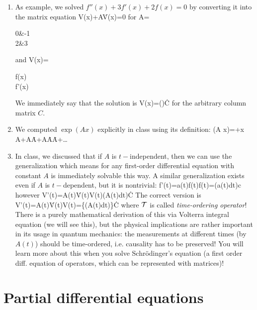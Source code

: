 {\begin{enumerate}
		\item As example, we solved $f''(x)+3f'(x)+2f(x)=0$ by converting it into the matrix equation
		\be 
		V(x)+A\. V(x)=0
		\ee 
		for 
		\be 
		A=\begin{pmatrix}
		0&-1\\2&3
		\end{pmatrix}
		\ee
		and
		\be 
		V(x)=\begin{pmatrix}
			f(x)\\f'(x)
		\end{pmatrix}
		\ee 
		We immediately say that the solution is 
		\be 
		V(x)=()\. C
		\ee 
		for the arbitrary column matrix $C$.
		\item We computed $\exp(A x)$ explicitly in class using its definition:
		\be 
		\exp(A x)=+x A+A\.A+A\.A\.A+\dots
		\ee 
		\item In class, we discussed that if $A$ is $t-$independent, then we can use the generalization
		\be 
		\left[f'(t)=af(t)\rightarrow f(t)=\exp(at)c\right]\Rightarrow\left[V'(t)=A\.V(t)\rightarrow V(t)=\exp(At)\.C\right]
		\ee
		which means for any first-order differential equation with constant $A$ is immediately solvable this way. A similar generalization exists even if $A$ is $t-$dependent, but it is nontrivial: 
		\be 
		f'(t)=a(t)f(t)\rightarrow f(t)=\exp\left(\int a(t)dt\right)c
		\ee
		however
		\be 
		V'(t)=A(t)\.V(t)\rightarrow V(t)\ne \exp\left(\int A(t)dt\right)\.C
		\ee 
		The correct version is 
		\be 
		V'(t)=A(t)\.V(t)\rightarrow V(t)=\left\{\exp\left(\int A(t)dt\right)\right\}\.C
		\ee 
		where $\mathcal{T}$ is called \emph{time-ordering operator}! There is a purely mathematical derivation of this via Volterra integral equation (we will see this), but the physical implications are rather important in its usage in quantum mechanics: the measurements at different times (by $A(t)$) should be time-ordered, i.e. causality has to be preserved! You will learn more about this when you solve Schrödinger's equation (a first order diff. equation of operators, which can be represented with matrices)!
	\end{enumerate}
}
\chapter{Partial differential equations}
